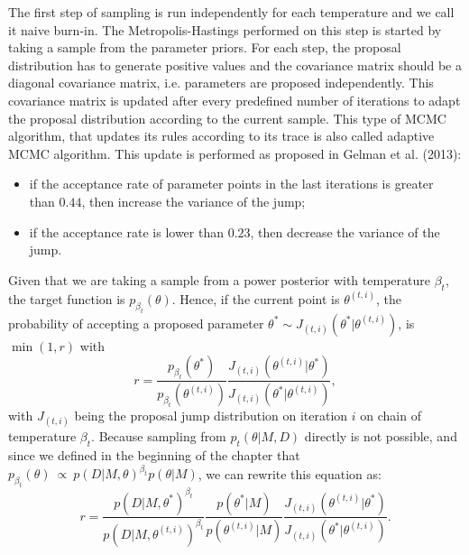 %

The first step of sampling is run independently for each temperature and
we call it naive burn-in. The Metropolis-Hastings performed on this step
is started by taking a sample from the parameter priors. For each step,
the proposal distribution has to generate positive values and the
covariance matrix should be a diagonal covariance matrix, i.e. 
parameters are proposed independently. This covariance matrix is updated 
after every predefined number of iterations to adapt the proposal 
distribution according to the current sample. This type of MCMC 
algorithm, that updates its rules according to its trace is also called
adaptive MCMC algorithm. This update is performed as proposed in Gelman 
et al. (2013): 
\begin{itemize}
\item{if the acceptance rate of parameter points in the last 
    iterations is greater than $0.44$, then increase the variance of the
    jump;}
\item{if the acceptance rate is lower than $0.23$, then decrease the 
    variance of the jump.}
\end{itemize}
Given that we are taking a sample from a power posterior with 
temperature $\beta_t$, the target function is 
$p_{\beta_t} (\theta)$. Hence, if the current point 
is $\theta^{(t, i)}$, the probability of accepting a proposed parameter 
$\theta^* \sim J_{(t, i)} (\theta^* | \theta^{(t, i)})$, is 
$\min (1, r)$ with
\begin{equation*}
    r = \frac{p_{\beta_t} (\theta^*)}
             {p_{\beta_t} (\theta^{(t, i)})}
        \frac{J_{(t, i)} (\theta^{(t, i)} | \theta^*)}
             {J_{(t, i)} (\theta^* | \theta^{(t, i)})},
\end{equation*}
with $J_{(t, i)}$ being the proposal jump distribution on iteration $i$ 
on chain of temperature $\beta_t$. Because sampling from $p_t(\theta | 
M, D)$ directly is not possible, and  since we defined in the beginning 
of the chapter that 
$p_{\beta_t} (\theta)~\propto~p (D|M, \theta)^{\beta_t} p (\theta | M)$,
we can rewrite this equation as:
\begin{equation}
    r = \frac{p (D | M, \theta^*)^{\beta_t}}
             {p (D | M, \theta^{(t, i)})^{\beta_t}}
        \frac{p (\theta^* | M)}
             {p (\theta^{(t, i)} | M)}
        \frac{J_{(t, i)} (\theta^{(t, i)} | \theta^*)}
             {J_{(t, i)} (\theta^* | \theta^{(t, i)})}.
    \label{eq:mh_ratio_step1}
\end{equation}

